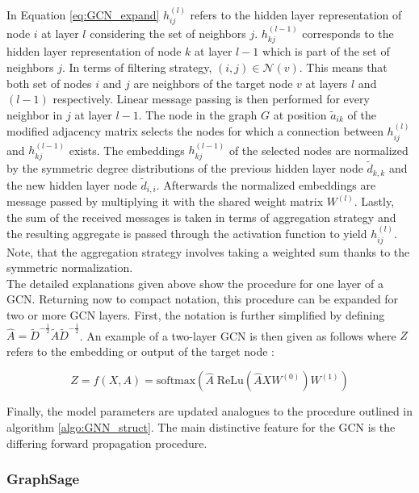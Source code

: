 	\noindent In Equation \ref{eq:GCN_expand} $h_{ij}^{(l)}$ refers to the 
	hidden layer representation of node $i$ at layer $l$ considering the set of
	neighbors $j$. $h_{kj}^{(l-1)}$ corresponds to the hidden layer
	representation of node $k$ at layer $l-1$ which is part of the set of 
	neighbors $j$. In terms of filtering strategy, $(i,j) \in \mathcal{N}(v)$. 
	This means that both set of nodes $i$ and $j$ are neighbors of the target 
	node $v$ at layers $l$ and $(l-1)$ respectively. Linear message
	passing is then performed for every neighbor in $j$ at layer $l-1$. The node 
	in the graph $G$ at position $\tilde a_{ik}$ of the modified adjacency matrix 
	selects the nodes for which a connection between $h_{ij}^{(l)}$ and
	$h_{kj}^{(l-1)}$ exists. The embeddings $h_{kj}^{(l-1)}$ of the selected 
	nodes are normalized by the symmetric degree distributions of the previous 
	hidden layer node $\tilde d_{k,k}$ and the new hidden layer node $\tilde d_{i,i}$.
	Afterwards the normalized embeddings are message passed by multiplying it
	with the shared weight matrix $W^{(l)}$. Lastly, the sum of the received
	messages is taken in terms of aggregation strategy and the resulting
	aggregate is passed through the activation function to yield $h_{ij}^{(l)}$.
	Note, that the aggregation strategy involves taking a weighted sum thanks
	to the symmetric normalization. \\

	\noindent The detailed explanations given above show the procedure for
	one layer of a GCN. Returning now to compact notation, this procedure can be
	expanded for two or more GCN layers. First, the notation is further
	simplified by defining $\hat A = \tilde D^{-\frac{1}{2}}\tilde A \tilde
	D^{-\frac{1}{2}}$. An example of a two-layer GCN is then given as follows 
	where $Z$ refers to the embedding or output of the target node 
	\citep[p. 3]{kipf2016semi}:

	\begin{equation}
		Z = f(X,A) = \text{softmax}\left(\hat A \;\text{ReLu}\left(\hat A X
		W^{(0)}\right)W^{(1)}\right)
	\label{eq:GCN_forward}
	\end{equation}

	\noindent Finally, the model parameters are updated analogues to the
	procedure outlined in algorithm \ref{algo:GNN_struct}. The main distinctive
	feature for the GCN is the differing forward propagation procedure. 

	\subsubsection{GraphSage}
	
